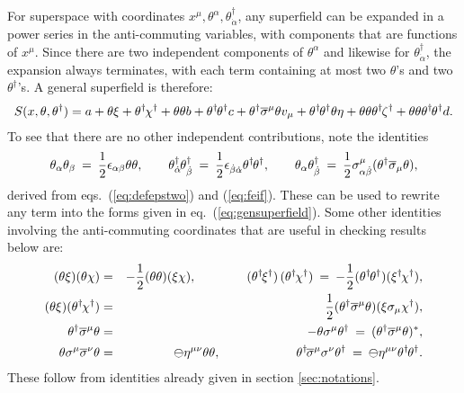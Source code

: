 \documentclass[11pt]{article}
\def\BDpos{}
\def\thetasigmamuthetadagger{\theta\sigma^\mu\theta^\dagger}
\def\thetasigmamuloweredthetadagger{\theta\sigma_\mu\theta^\dagger}
\def\BDpos{-}
\def\thetasigmamuthetadagger{\theta^\dagger\sigmabar^\mu\theta}
\def\thetasigmamuloweredthetadagger{\theta^\dagger\sigmabar_\mu\theta}
\def\BDpos{\oplus}
\def\thetasigmamuthetadagger{\theta\sigma^\mu\theta^\dagger}
\def\thetasigmamuloweredthetadagger{\theta\sigma_\mu\theta^\dagger}
\def\BDpos{\ominus}
\def\thetasigmamuthetadagger{\theta^\dagger\sigmabar^\mu\theta}
\def\thetasigmamuloweredthetadagger{\theta^\dagger\sigmabar_\mu\theta}
\newcommand{\thdthd}{\theta^\dagger\hspace{-1pt}\theta^\dagger}
\def\beq{\begin{eqnarray}}
\def\eeq{\end{eqnarray}}
\def\sigmabar{\overline\sigma}
\begin{document}
For superspace with coordinates $x^\mu, \theta^\alpha, \theta^\dagger_{\dot\alpha}$,
any superfield can be expanded in a power series in the anti-commuting variables, with components
that are functions of $x^\mu$. Since there are two 
independent components of $\theta^\alpha$ and 
likewise for $\theta^\dagger_{\dot\alpha}$, the expansion always 
terminates, with each term containing at 
most two $\theta$'s and two $\theta^\dagger$'s.
A general superfield is therefore:
\beq
S(x, \theta, \theta^\dagger) = 
a
+ \theta \xi 
+ \theta^\dagger\hspace{-1pt} \chi^\dagger 
+ \theta\theta b 
+ \thdthd c 
+ \thetasigmamuthetadagger v_\mu 
+ \thdthd  \theta \eta 
+ \theta \theta  \theta^\dagger\hspace{-1pt} \zeta^\dagger 
+ \theta\theta\thdthd d.
\label{eq:gensuperfield}
\eeq
To see that there are no other independent contributions, note the identities
\beq
\theta_\alpha \theta_\beta \>=\> \frac{1}{2} \epsilon_{\alpha\beta} \theta\theta
,
\qquad
\theta^\dagger_{\dot \alpha}\hspace{-1pt} \theta^\dagger_{\dot \beta} 
\>=\> \frac{1}{2} \epsilon_{\dot\beta\dot\alpha} 
\thdthd
,
\qquad
\theta_\alpha 
\theta^\dagger_{\dot\beta} 
\>=\> \frac{1}{2} 
\sigma^\mu_{\alpha\dot\beta}
(\thetasigmamuloweredthetadagger)
,
\eeq
derived from eqs.~(\ref{eq:defepstwo}) and (\ref{eq:feif}). 
These can be used to rewrite any term into the forms given
in eq.~(\ref{eq:gensuperfield}).
Some other identities involving the anti-commuting coordinates that are 
useful in checking results below are:
\beq
(\theta \xi)( \theta\chi) 
&=& -\frac{1}{2}(\theta\theta)( \xi\chi)
,
\qquad\qquad
(\theta^\dagger 
\hspace{-1pt} 
\xi^\dagger)
\, 
(\theta^\dagger 
\hspace{-1pt}
\chi^\dagger)
\>=\> 
-\frac{1}{2}(\thdthd ) (\xi^\dagger\hspace{-1pt}\chi^\dagger)
,
\\
(\theta \xi )(\theta^\dagger
\hspace{-1pt} 
\chi^\dagger )
&=&
\frac{1}{2} (\thetasigmamuthetadagger )
(\xi \sigma_\mu \chi^\dagger ),
\\
\theta^\dagger \sigmabar^\mu \theta &=& -\theta \sigma^\mu \theta^\dagger 
\>=\> 
(\theta^\dagger \sigmabar^\mu \theta)^*,
\\
\theta \sigma^\mu \sigmabar^\nu \theta &=& 
\BDpos\eta^{\mu\nu} \theta\theta ,
\qquad\qquad\qquad
\theta^\dagger\hspace{-1pt} \sigmabar^\mu \sigma^\nu \theta^\dagger \>=\> 
\BDpos\eta^{\mu\nu} \thdthd.
\eeq
These follow from identities already given in section 
\ref{sec:notations}.
\end{document}
